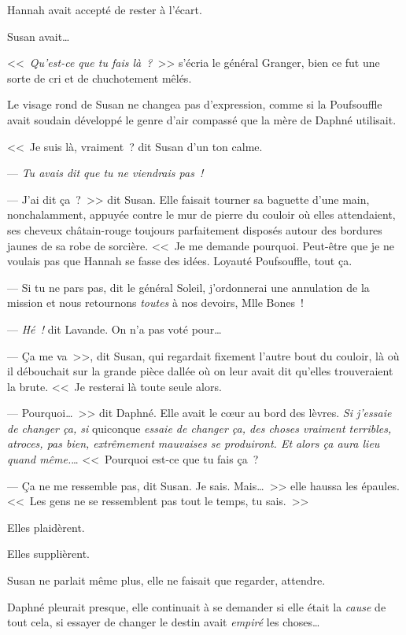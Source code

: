 Hannah avait accepté de rester à l'écart.

Susan avait…

\later

<<~\emph{Qu'est-ce que tu fais là~?}~>> s'écria le général Granger, bien ce fut une sorte de cri et de chuchotement mêlés.

Le visage rond de Susan ne changea pas d'expression, comme si la Poufsouffle avait soudain développé le genre d'air compassé que la mère de Daphné utilisait.

<<~Je suis là, vraiment~? dit Susan d'un ton calme.

--- \emph{Tu avais dit que tu ne viendrais pas~!}

--- J'ai dit ça~?~>> dit Susan. Elle faisait tourner sa baguette d'une main, nonchalamment, appuyée contre le mur de pierre du couloir où elles attendaient, ses cheveux châtain-rouge toujours parfaitement disposés autour des bordures jaunes de sa robe de sorcière. <<~Je me demande pourquoi. Peut-être que je ne voulais pas que Hannah se fasse des idées. Loyauté Poufsouffle, tout ça.

--- Si tu ne pars pas, dit le général Soleil, j'ordonnerai une annulation de la mission et nous retournons \emph{toutes} à nos devoirs, Mlle Bones~!

--- \emph{Hé~!} dit Lavande. On n'a pas voté pour…

--- Ça me va~>>, dit Susan, qui regardait fixement l'autre bout du couloir, là où il débouchait sur la grande pièce dallée où on leur avait dit qu'elles trouveraient la brute. <<~Je resterai là toute seule alors.

--- Pourquoi…~>> dit Daphné. Elle avait le cœur au bord des lèvres. \emph{Si j'essaie de changer ça, si} quiconque \emph{essaie de changer ça, des choses vraiment terribles, atroces, pas bien, extrêmement mauvaises se produiront. Et alors ça aura lieu quand même.}… <<~Pourquoi est-ce que tu fais ça~?

--- Ça ne me ressemble pas, dit Susan. Je sais. Mais…~>> elle haussa les épaules. <<~Les gens ne se ressemblent pas tout le temps, tu sais.~>>

Elles plaidèrent.

Elles supplièrent.

Susan ne parlait même plus, elle ne faisait que regarder, attendre.

Daphné pleurait presque, elle continuait à se demander si elle était la \emph{cause} de tout cela, si essayer de changer le destin avait \emph{empiré} les choses…

